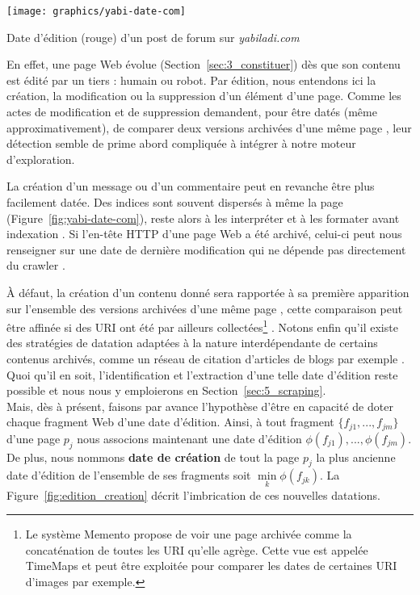 \documentclass[symmetric,justified,marginals=raggedouter]{tufte-book}
\begin{document}
\begin{marginfigure}%
  \texttt{[image: graphics/yabi-date-com]}
  \caption{Date d'édition (rouge) d'un post de forum sur \textit{yabiladi.com}}
  \label{fig:yabi-date-com}
\end{marginfigure}  

En effet, une page Web évolue (Section~\ref{sec:3_constituer}) dès que son contenu est édité par un tiers : humain ou robot. Par édition, nous entendons ici la création, la modification ou la suppression d'un élément d'une page. Comme les actes de modification et de suppression demandent, pour être datés (même approximativement), de comparer deux versions archivées d'une même page \citep{rocco_page_2003, nunes_using_2007}, leur détection semble de prime abord compliquée à intégrer à notre moteur d'exploration. 

La création d'un message ou d'un commentaire peut en revanche être plus facilement datée. Des indices sont souvent dispersés à même la page (Figure~\ref{fig:yabi-date-com}), reste alors à les interpréter et à les formater avant indexation \citep{de_jong_temporal_2005,kanhabua_using_2009}. Si l'en-tête HTTP d'une page Web a été archivé, celui-ci peut nous renseigner sur une date de dernière modification qui ne dépende pas directement du crawler  \citep{amitay_trend_2004}. 

À défaut, la création d'un contenu donné sera rapportée à sa première apparition sur l'ensemble des versions archivées d'une même page \citep{jatowt_detecting_2007}, cette comparaison peut être affinée si des URI ont été par ailleurs collectées\footnote{\RaggedOuter Le système Memento propose de voir une page archivée comme la concaténation de toutes les URI qu'elle agrège. Cette vue est appelée TimeMaps  \citep{van_de_sompel_http_2013} et peut être exploitée pour comparer les dates de certaines URI d'images par exemple.} \citep{aturban_difficulties_2017}. Notons enfin qu'il existe des stratégies de datation adaptées à la nature interdépendante de certains contenus archivés, comme un réseau de citation d'articles de blogs par exemple \citep{toyoda_whats_2006,spitz_predicting_2018}. Quoi qu'il en soit, l'identification et l'extraction d'une telle date d'édition reste possible et nous nous y emploierons en Section~\ref{sec:5_scraping}. \\

\noindent Mais, dès à présent, faisons par avance l'hypothèse d'être en capacité de doter chaque fragment Web d'une date d'édition. Ainsi, à tout fragment $\{f_{j1},...,f_{jm}\}$ d'une page $p_j$ nous associons maintenant une date d'édition $\phi(f_{j1}),...,\phi(f_{jm})$. De plus, nous nommons \textbf{date de création} de tout la page $p_j$ la plus ancienne date d'édition de l'ensemble de ses fragments soit $\min\limits_{k} \phi(f_{jk})$. La Figure~\ref{fig:edition_creation} décrit l'imbrication de ces nouvelles datations. 
\end{document}
